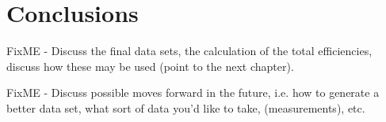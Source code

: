 
	\section{Conclusions}
     	\label{sec:CutConclusions}		
	

FixME - Discuss the final data sets, the calculation of the total efficiencies, discuss how these may be used (point to the next chapter).  
  
FixME - Discuss possible moves forward in the future, i.e. how to generate a better data set, what sort of data you'd like to take, (measurements), etc.  			


